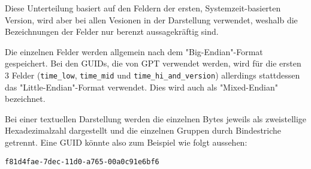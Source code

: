 Diese Unterteilung basiert auf den Feldern der ersten, Systemzeit-basierten Version, wird aber bei allen Vesionen in der Darstellung verwendet, weshalb die Bezeichnungen der Felder nur berenzt aussagekräftig sind.\cite{uuid-rfc}

Die einzelnen Felder werden allgemein nach dem "Big-Endian"-Format gespeichert.
Bei den GUIDs, die von GPT verwendet werden, wird für die ersten 3 Felder (\texttt{time\_low}, \texttt{time\_mid} und \texttt{time\_hi\_and\_version}) allerdings stattdessen das "Little-Endian"-Format verwendet.\cite{uefi-spec}
Dies wird auch als "Mixed-Endian" bezeichnet.

Bei einer textuellen Darstellung werden die einzelnen Bytes jeweils als zweistellige Hexadezimalzahl dargestellt und die einzelnen Gruppen durch Bindestriche getrennt.
Eine GUID könnte also zum Beispiel wie folgt aussehen:

\vspace{-0.5cm}

\begin{center}
    \texttt{f81d4fae-7dec-11d0-a765-00a0c91e6bf6}
\end{center}
